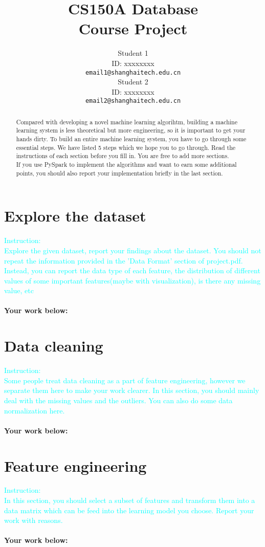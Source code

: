 \documentclass{article}
\title{CS150A Database \\Course Project}
\author{
  Student 1\\
  ID: xxxxxxxx\\
  \texttt{email1@shanghaitech.edu.cn} \\
   \And
  Student 2\\
  ID: xxxxxxxx\\
  \texttt{email2@shanghaitech.edu.cn}
}
\begin{document}

\maketitle

\begin{abstract}

Compared with developing a novel machine learning algorihtm, building a machine learning system is less theoretical but more engineering, so it is important to get your hands dirty. To build an entire machine learning system, you have to go through some essential steps. We have listed 5 steps which we hope you to go through. Read the instructions of each section before you fill in. You are free to add more sections. \\
If you use PySpark to implement the algorithms and want to earn some additional points, you should also report your implementation briefly in the last section.
\end{abstract}

\section{Explore the dataset}
\textcolor{cyan}{Instruction: \\
Explore the given dataset, report your findings about the dataset. You should not repeat the information provided in the 'Data Format' section of project.pdf. Instead, you can report the data type of each feature, the distribution of different values of some important features(maybe with visualization), is there any missing value, etc}\\\\
\textbf{Your work below:}\\
\section{Data cleaning}
\textcolor{cyan}{Instruction: \\
Some people treat data cleaning as a part of feature engineering, however we separate them here to make your work clearer. In this section, you should mainly deal with the missing values and the outliers. You can also do some data normalization here.}\\\\
\textbf{Your work below:}\\
\section{Feature engineering}
\textcolor{cyan}{Instruction: \\
In this section, you should select a subset of features and transform them into a data matrix which can be feed into the learning model you choose. Report your work with reasons.}\\\\
\textbf{Your work below:}\\
\end{document}
